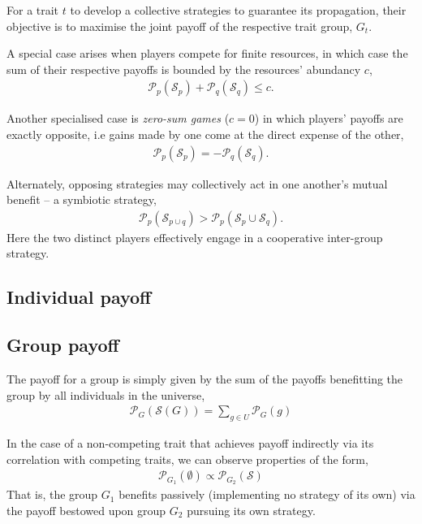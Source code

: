 \documentclass[twocolumn, aps, rmp, amsmath, amssymb, nofootinbib, superscriptaddress, longbibliography, floatfix, table-of-contents, eqsecnum]{revtex4-2}
\begin{document}
For a trait $t$ to develop a collective strategies to guarantee its propagation, their objective is to maximise the joint payoff of the respective trait group, $G_t$.

A special case arises when players compete for finite resources, in which case the sum of their respective payoffs is bounded by the resources' abundancy $c$,
\begin{align}
	\mathcal{P}_p(\mathcal{S}_p) + \mathcal{P}_q(\mathcal{S}_q) \leq c.
\end{align}

Another specialised case is \textit{zero-sum games} ($c=0$) in which players' payoffs are exactly opposite, i.e gains made by one come at the direct expense of the other,
\begin{align}
\mathcal{P}_p(\mathcal{S}_p) = -\mathcal{P}_q(\mathcal{S}_q).
\end{align}

Alternately, opposing strategies may collectively act in one another's mutual benefit -- a symbiotic strategy,
\begin{align}
\mathcal{P}_p(\mathcal{S}_{p\cup q}) > \mathcal{P}_p(\mathcal{S}_p\cup \mathcal{S}_q).
\end{align}
Here the two distinct players effectively engage in a cooperative inter-group strategy.

\subsection{Individual payoff}

\subsection{Group payoff}

The payoff for a group is simply given by the sum of the payoffs benefitting the group by all individuals in the universe,
\begin{align}
	\mathcal{P}_{G}(\mathcal{S}(G)) = \sum_{g\in U} \mathcal{P}_G(g)
\end{align}

In the case of a non-competing trait that achieves payoff indirectly via its correlation with competing traits, we can observe properties of the form,
\begin{align}
	\mathcal{P}_{G_1}(\emptyset) \propto \mathcal{P}_{G_2}(\mathcal{S})
\end{align}
That is, the group $G_1$ benefits passively (implementing no strategy of its own) via the payoff bestowed upon group $G_2$ pursuing its own strategy.
\end{document}
